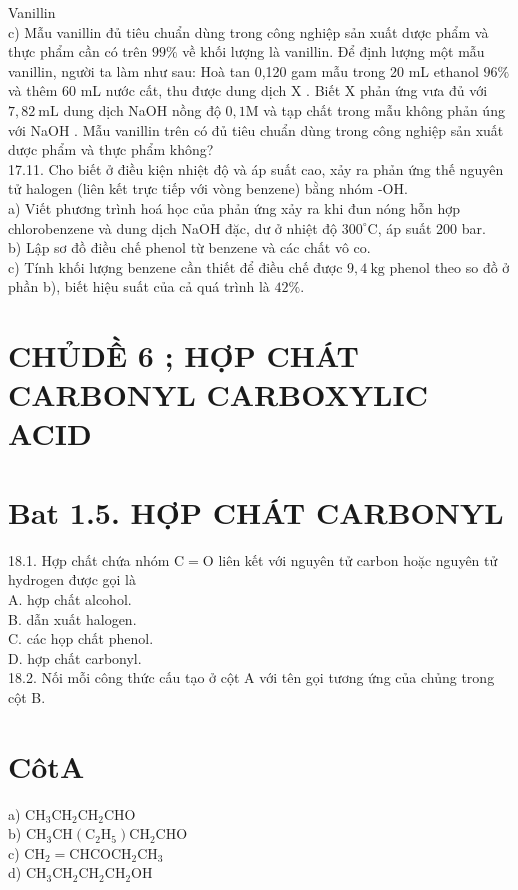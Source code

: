 \documentclass[10pt]{article}
\begin{document}
Vanillin\\
c) Mẫu vanillin đủ tiêu chuẩn dùng trong công nghiệp sản xuất dược phẩm và thực phẩm cần có trên $99 \%$ về khối lượng là vanillin. Để định lượng một mẫu vanillin, người ta làm như sau: Hoà tan 0,120 gam mẫu trong 20 mL ethanol $96 \%$ và thêm 60 mL nước cất, thu được dung dịch X . Biết X phản ứng vưa đủ với $7,82 \mathrm{~mL}$ dung dịch NaOH nồng độ $0,1 \mathrm{M}$ và tạp chất trong mẫu không phản úng với NaOH . Mẫu vanillin trên có đủ tiêu chuẩn dùng trong công nghiệp sản xuất dược phẩm và thực phẩm không?\\
17.11. Cho biết ở điều kiện nhiệt độ và áp suất cao, xảy ra phản ứng thế nguyên tử halogen (liên kết trực tiếp với vòng benzene) bằng nhóm -OH.\\
a) Viết phương trình hoá học của phản ứng xảy ra khi đun nóng hỗn hợp chlorobenzene và dung dịch NaOH đặc, dư ở nhiệt độ $300^{\circ} \mathrm{C}$, áp suất 200 bar.\\
b) Lập sơ đồ điều chế phenol từ benzene và các chất vô co.\\
c) Tính khối lượng benzene cần thiết để điều chế được $9,4 \mathrm{~kg}$ phenol theo so đồ ở phần b), biết hiệu suất của cả quá trình là $42 \%$.

\section*{CHỦDỀ 6 ; HỢP CHÁT CARBONYL CARBOXYLIC ACID}
\section*{Bat 1.5. HỢP CHÁT CARBONYL}
18.1. Hợp chất chứa nhóm $\mathrm{C}=\mathrm{O}$ liên kết với nguyên tử carbon hoặc nguyên tử hydrogen được gọi là\\
A. hợp chất alcohol.\\
B. dẫn xuất halogen.\\
C. các họp chất phenol.\\
D. hợp chất carbonyl.\\
18.2. Nối mỗi công thức cấu tạo ở cột A với tên gọi tương ứng của chủng trong cột B.

\section*{CôtA}
a) $\mathrm{CH}_{3} \mathrm{CH}_{2} \mathrm{CH}_{2} \mathrm{CHO}$\\
b) $\mathrm{CH}_{3} \mathrm{CH}\left(\mathrm{C}_{2} \mathrm{H}_{5}\right) \mathrm{CH}_{2} \mathrm{CHO}$\\
c) $\mathrm{CH}_{2}=\mathrm{CHCOCH}_{2} \mathrm{CH}_{3}$\\
d) $\mathrm{CH}_{3} \mathrm{CH}_{2} \mathrm{CH}_{2} \mathrm{CH}_{2} \mathrm{OH}$
\end{document}

